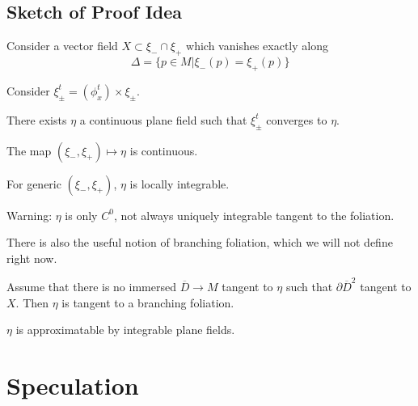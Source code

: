 \subsection{Sketch of Proof Idea }

Consider a vector field $X\subset \xi_- \cap \xi_+$ which vanishes exactly along
\[
\Delta = \{ p\in M| \xi_-(p) = \xi_+(p)\}
\]

Consider $\xi_\pm^t= (\phi_x^t) \times \xi_\pm$.

\begin{proposition}

There exists $\eta$ a continuous plane field such that $\xi_\pm^t$ converges to $\eta$.

\end{proposition}

\begin{proposition}

The map $(\xi_-, \xi_+)\mapsto \eta$ is continuous.

\end{proposition}

\begin{proposition}

For generic $(\xi_-,\xi_+)$, $\eta$ is locally integrable.

\end{proposition}

Warning: $\eta$ is only $C^0$, not always uniquely integrable tangent to the foliation.

There is also the useful notion of branching foliation, which we will not define right now.

\begin{proposition}

Assume that there is no immersed $\overline{D}\to M$ tangent to $\eta$ such that $\partial \overline{D}^2$ tangent to $X$. Then $\eta$ is tangent to a branching foliation.

\end{proposition}

\begin{proposition}

$\eta$ is approximatable by integrable plane fields.

\end{proposition}

\section{Speculation}

